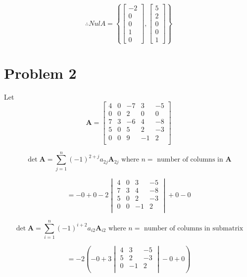 \documentclass[12pt, a4paper]{article}
\begin{document}
\[
    \therefore Nul A =
    \left\{
        \begin{bmatrix}
            -2 \\
            0 \\
            0 \\
            1 \\
            0
        \end{bmatrix}, \begin{bmatrix}
            5 \\
            2 \\
            0 \\
            0 \\
            1
        \end{bmatrix}
    \right\}
\]

\section*{Problem 2}

Let \[
    \boldsymbol{A} = \begin{bmatrix}
        4 & 0 & -7 & 3 & -5 \\
        0 & 0 & 2 & 0 & 0 \\
        7 & 3 & -6 & 4 & -8 \\
        5 & 0 & 5 & 2 & -3 \\
        0 & 0 & 9 & -1 & 2 \\
    \end{bmatrix}
\]

\[
    \det\boldsymbol{A} = \sum_{j=1}^n (-1)^{2 + j} a_{2j}\boldsymbol{A}_{2j} \text { where } n = \text{ number of columns in } \boldsymbol{A}
\]

\[
    = -0 + 0 - 2\begin{vmatrix}
        4 & 0 & 3 & -5 \\
        7 & 3 & 4 & -8 \\
        5 & 0 & 2 & -3 \\
        0 & 0 & -1 & 2 \\
    \end{vmatrix} + 0 - 0
\]

\[
    \det\boldsymbol{A} = \sum_{i=1}^n (-1)^{i + 2} a_{i2}\boldsymbol{A}_{i2} \text { where } n = \text{ number of columns in submatrix}
\]

\[
    = -2\left(-0 + 3\begin{vmatrix}
        4 & 3 & -5 \\
        5 & 2 & -3 \\
        0 & -1 & 2 \\
    \end{vmatrix} - 0 + 0\right)
\]
\end{document}
